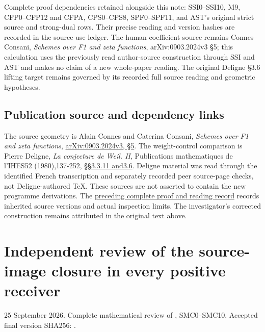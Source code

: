 Complete proof dependencies retained alongside this note: SSI0--SSI10,
M9, CFP0--CFP12 and CFPA, CPS0--CPS8, SPF0--SPF11, and AST's original
strict source and strong-dual rows. Their precise reading and version
hashes are recorded in the source-use ledger. The human coefficient
source remains Connes--Consani, \emph{Schemes over F1 and zeta
functions}, arXiv:0903.2024v3 §5; this calculation uses the previously
read author-source construction through SSI and AST and makes no claim
of a new whole-paper reading. The original Deligne §3.6 lifting target
remains governed by its recorded full source reading and geometric
hypotheses.

\section{Publication source and dependency
links}\label{publication-source-and-dependency-links-10}

The source geometry is Alain Connes and Caterina Consani, \emph{Schemes
over F1 and zeta functions},
\href{https://arxiv.org/abs/0903.2024v3}{arXiv:0903.2024v3, §5}. The
weight-control comparison is Pierre Deligne, \emph{La conjecture de
Weil. II}, Publications mathematiques de l'IHES52 (1980),137-252,
\href{https://www.numdam.org/item/PMIHES_1980__52__137_0/}{§§3.3.11
and3.6}. Deligne material was read through the identified French
transcription and separately recorded peer source-page checks, not
Deligne-authored TeX. These sources are not asserted to contain the new
programme derivations. The
\href{https://github.com/KokunoYumeto/zeta-function-research-reader/blob/36a82ecca98addb8a98b48204e349737856c7223/workbenches/splitzero-tandem/continuations/20260924-cohomology-weight-and-character-lifts/BUILD_AND_REVIEW.md}{preceding
complete proof and reading record} records inherited source versions and
actual inspection limits. The investigator's corrected construction
remains attributed in the original text above.

\chapter{Independent review of the source-image closure in every
positive
receiver}\label{independent-review-of-the-source-image-closure-in-every-positive-receiver}

25 September 2026. Complete mathematical review of
\href{https://github.com/KokunoYumeto/zeta-function-research-reader/blob/main/workbenches/splitzero-tandem/continuations/20260925-full-source-tensor-and-original-divisor/identity/SOURCE_MEASURE_CLOSURE_AND_ORIGINAL_QUOTIENT.md}{},
SMC0--SMC10. Accepted final version SHA256:
.

